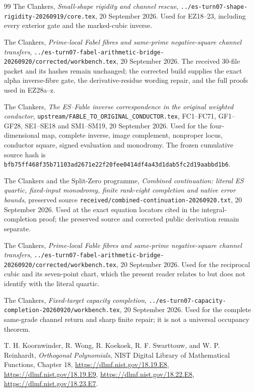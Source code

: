 \documentclass[11pt]{article}
\theoremstyle{definition}\newtheorem{definition}[theorem]{Definition}
\theoremstyle{remark}\newtheorem{remark}[theorem]{Remark}
\begin{document}
\begin{thebibliography}{99}
The Clankers,
\emph{Small-shape rigidity and channel rescue},
\texttt{../es-turn07-shape-rigidity-20260919/core.tex},
20 September 2026.
Used for EZ18--23, including every exterior gate and the marked-cubic inverse.

The Clankers,
\emph{Prime-local Fabel fibres and same-prime negative-square channel
transfers},
\texttt{../es-turn07-fabel-arithmetic-bridge-20260920/corrected/workbench.tex},
20 September 2026.
The received 30-file packet and its hashes remain unchanged; the corrected
build supplies the exact alpha inverse-fibre gate, the derivative-residue
wording repair, and the full proofs used in EZ28a--z.

The Clankers,
\emph{The ES--Fable inverse correspondence in the original weighted conductor},
\texttt{upstream/FABLE\_TO\_ORIGINAL\_CONDUCTOR.tex},
FC1--FC71, GF1--GF28, SE1--SE18 and SM1--SM19,
20 September 2026.
Used for the four-dimensional map, complete inverse, image complement,
nonproper locus, conductor square, signed evaluation and monodromy.  The frozen
cumulative source hash is
\texttt{bfb75ff468f35b71103ad2671e22f20fee0414df4a43d1dab5fc2d19aabbd1b6}.

The Clankers and the Split-Zero programme,
\emph{Combined continuation: literal ES quartic, fixed-input monodromy,
finite rank-eight completion and native error bounds},
preserved source \texttt{received/combined-continuation-20260920.txt},
20 September 2026.
Used at the exact equation locators cited in the integral-completion proof;
the preserved source and corrected public derivation remain separate.

The Clankers,
\emph{Prime-local Fable fibres and same-prime negative-square channel
transfers},
\texttt{../es-turn07-fabel-arithmetic-bridge-20260920/corrected/workbench.tex},
20 September 2026.
Used for the reciprocal cubic and its seven-point chart, which the present
reader relates to but does not identify with the literal quartic.

The Clankers,
\emph{Fixed-target capacity completion},
\texttt{../es-turn07-capacity-completion-20260920/workbench.tex},
20 September 2026.
Used for the complete same-grade channel return and sharp finite repair; it is
not a universal occupancy theorem.

T. H. Koornwinder, R. Wong, R. Koekoek, R. F. Swarttouw,
and W. P. Reinhardt,
\emph{Orthogonal Polynomials}, NIST Digital Library of Mathematical Functions,
Chapter 18,
\url{https://dlmf.nist.gov/18.19.E8},
\url{https://dlmf.nist.gov/18.19.E9},
\url{https://dlmf.nist.gov/18.22.E8},
\url{https://dlmf.nist.gov/18.23.E7}.


\end{thebibliography}
\end{document}
